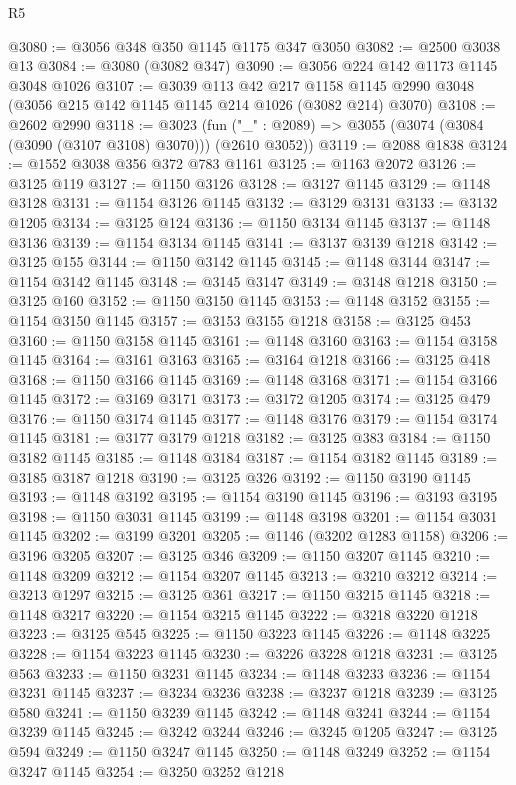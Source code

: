 \begin{lexlean}{R5}
\begin{coremodule}
@3080 := @3056 @348 @350 @1145 @1175 @347 @3050
@3082 := @2500 @3038 @13
@3084 := @3080 (@3082 @347)
@3090 := @3056 @224 @142 @1173 @1145 @3048 @1026
@3107 := @3039
    @113
    @42
    @217
    @1158
    @1145
    @2990
    @3048
    (@3056 @215 @142 @1145 @1145 @214 @1026 (@3082 @214) @3070)
@3108 := @2602 @2990
@3118 := @3023
    (fun ("_" : @2089) => @3055 (@3074 (@3084 (@3090 (@3107 @3108) @3070))) (@2610 @3052))
@3119 := @2088 @1838
@3124 := @1552 @3038 @356 @372 @783 @1161
@3125 := @1163 @2072
@3126 := @3125 @119
@3127 := @1150 @3126
@3128 := @3127 @1145
@3129 := @1148 @3128
@3131 := @1154 @3126 @1145
@3132 := @3129 @3131
@3133 := @3132 @1205
@3134 := @3125 @124
@3136 := @1150 @3134 @1145
@3137 := @1148 @3136
@3139 := @1154 @3134 @1145
@3141 := @3137 @3139 @1218
@3142 := @3125 @155
@3144 := @1150 @3142 @1145
@3145 := @1148 @3144
@3147 := @1154 @3142 @1145
@3148 := @3145 @3147
@3149 := @3148 @1218
@3150 := @3125 @160
@3152 := @1150 @3150 @1145
@3153 := @1148 @3152
@3155 := @1154 @3150 @1145
@3157 := @3153 @3155 @1218
@3158 := @3125 @453
@3160 := @1150 @3158 @1145
@3161 := @1148 @3160
@3163 := @1154 @3158 @1145
@3164 := @3161 @3163
@3165 := @3164 @1218
@3166 := @3125 @418
@3168 := @1150 @3166 @1145
@3169 := @1148 @3168
@3171 := @1154 @3166 @1145
@3172 := @3169 @3171
@3173 := @3172 @1205
@3174 := @3125 @479
@3176 := @1150 @3174 @1145
@3177 := @1148 @3176
@3179 := @1154 @3174 @1145
@3181 := @3177 @3179 @1218
@3182 := @3125 @383
@3184 := @1150 @3182 @1145
@3185 := @1148 @3184
@3187 := @1154 @3182 @1145
@3189 := @3185 @3187 @1218
@3190 := @3125 @326
@3192 := @1150 @3190 @1145
@3193 := @1148 @3192
@3195 := @1154 @3190 @1145
@3196 := @3193 @3195
@3198 := @1150 @3031 @1145
@3199 := @1148 @3198
@3201 := @1154 @3031 @1145
@3202 := @3199 @3201
@3205 := @1146 (@3202 @1283 @1158)
@3206 := @3196 @3205
@3207 := @3125 @346
@3209 := @1150 @3207 @1145
@3210 := @1148 @3209
@3212 := @1154 @3207 @1145
@3213 := @3210 @3212
@3214 := @3213 @1297
@3215 := @3125 @361
@3217 := @1150 @3215 @1145
@3218 := @1148 @3217
@3220 := @1154 @3215 @1145
@3222 := @3218 @3220 @1218
@3223 := @3125 @545
@3225 := @1150 @3223 @1145
@3226 := @1148 @3225
@3228 := @1154 @3223 @1145
@3230 := @3226 @3228 @1218
@3231 := @3125 @563
@3233 := @1150 @3231 @1145
@3234 := @1148 @3233
@3236 := @1154 @3231 @1145
@3237 := @3234 @3236
@3238 := @3237 @1218
@3239 := @3125 @580
@3241 := @1150 @3239 @1145
@3242 := @1148 @3241
@3244 := @1154 @3239 @1145
@3245 := @3242 @3244
@3246 := @3245 @1205
@3247 := @3125 @594
@3249 := @1150 @3247 @1145
@3250 := @1148 @3249
@3252 := @1154 @3247 @1145
@3254 := @3250 @3252 @1218

\end{coremodule}
\end{lexlean}
